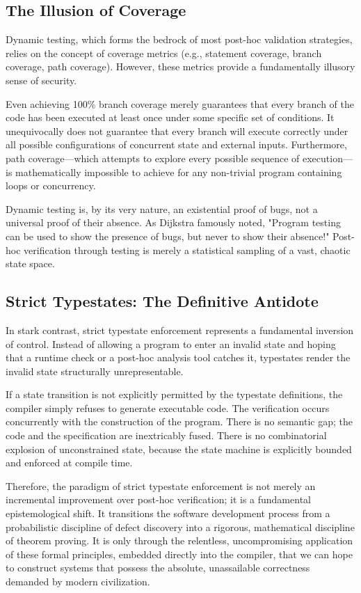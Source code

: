 \subsection{The Illusion of Coverage}

Dynamic testing, which forms the bedrock of most post-hoc validation strategies, relies on the concept of coverage metrics (e.g., statement coverage, branch coverage, path coverage). However, these metrics provide a fundamentally illusory sense of security.

Even achieving 100\% branch coverage merely guarantees that every branch of the code has been executed at least once under some specific set of conditions. It unequivocally does not guarantee that every branch will execute correctly under all possible configurations of concurrent state and external inputs. Furthermore, path coverage---which attempts to explore every possible sequence of execution---is mathematically impossible to achieve for any non-trivial program containing loops or concurrency.

Dynamic testing is, by its very nature, an existential proof of bugs, not a universal proof of their absence. As Dijkstra famously noted, "Program testing can be used to show the presence of bugs, but never to show their absence!" Post-hoc verification through testing is merely a statistical sampling of a vast, chaotic state space.

\subsection{Strict Typestates: The Definitive Antidote}

In stark contrast, strict typestate enforcement represents a fundamental inversion of control. Instead of allowing a program to enter an invalid state and hoping that a runtime check or a post-hoc analysis tool catches it, typestates render the invalid state structurally unrepresentable.

If a state transition is not explicitly permitted by the typestate definitions, the compiler simply refuses to generate executable code. The verification occurs concurrently with the construction of the program. There is no semantic gap; the code and the specification are inextricably fused. There is no combinatorial explosion of unconstrained state, because the state machine is explicitly bounded and enforced at compile time.

Therefore, the paradigm of strict typestate enforcement is not merely an incremental improvement over post-hoc verification; it is a fundamental epistemological shift. It transitions the software development process from a probabilistic discipline of defect discovery into a rigorous, mathematical discipline of theorem proving. It is only through the relentless, uncompromising application of these formal principles, embedded directly into the compiler, that we can hope to construct systems that possess the absolute, unassailable correctness demanded by modern civilization.

